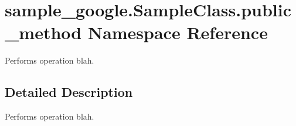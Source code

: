 \hypertarget{namespacesample__google_1_1_sample_class_1_1public__method}{\section{sample\-\_\-google.\-Sample\-Class.\-public\-\_\-method Namespace Reference}
\label{namespacesample__google_1_1_sample_class_1_1public__method}
}


Performs operation blah.  




\subsection{Detailed Description}
Performs operation blah. 